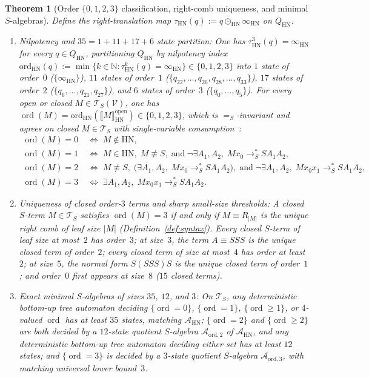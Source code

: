 \documentclass[11pt,reqno]{amsart}
\numberwithin{equation}{section}
\theoremstyle{plain}
\newtheorem{theorem}{Theorem}[section]
\theoremstyle{definition}
\theoremstyle{remark}
\DeclareMathOperator{\ord}{ord}
\newcommand{\TS}{\mathcal{T}_S}
\newcommand{\TSV}{\mathcal{T}_S(\mathcal{V})}
\newcommand{\HN}{\mathrm{HN}}
\newcommand{\sem}[1]{\llbracket #1 \rrbracket}
\newcommand{\redSs}{\to_S^*}
\newcommand{\convS}{=_S}
\begin{document}
\begin{theorem}[Order $\{0, 1, 2, 3\}$ classification, right-comb uniqueness, and minimal $S$-algebras]\label{thm:order-hierarchy}
Define the right-translation map $\tau_{\HN}(q) := q \odot_{\HN} \infty_{\HN}$ on $Q_{\HN}$.
\begin{enumerate}[label=(\roman*),leftmargin=2.2em]
  \item \emph{Nilpotency and $35 = 1 + 11 + 17 + 6$ state partition:} One has $\tau_{\HN}^3(q) = \infty_{\HN}$ for every $q \in Q_{\HN}$, partitioning $Q_{\HN}$ by nilpotency index $\mathrm{ord}_{\HN}(q) := \min\{k \in \mathbb{N} : \tau_{\HN}^k(q) = \infty_{\HN}\} \in \{0, 1, 2, 3\}$ into $1$ state of order~$0$ ($\{\infty_{\HN}\}$), $11$ states of order~$1$ ($\{q_{22}, \dots, q_{26}, q_{28}, \dots, q_{33}\}$), $17$ states of order~$2$ ($\{q_6, \dots, q_{21}, q_{27}\}$), and $6$ states of order~$3$ ($\{q_0, \dots, q_5\}$). For every open or closed $M \in \TSV$, one has $\ord(M) = \mathrm{ord}_{\HN}(\sem{M}_{\HN}^{\mathrm{open}}) \in \{0, 1, 2, 3\}$, which is $\convS$-invariant and agrees on closed $M \in \TS$ with single-variable consumption~\cite[Definition~21]{BarendregtEndrullisKlopWaldmann2017}:
  \begin{align*}
  \ord(M) = 0 &\;\Longleftrightarrow\; M \notin \HN, \\
  \ord(M) = 1 &\;\Longleftrightarrow\; M \in \HN,\; M \not\equiv S,\;\textrm{and}\; \neg\exists A_1, A_2,\; M x_0 \redSs S A_1 A_2, \\
  \ord(M) = 2 &\;\Longleftrightarrow\; M \not\equiv S,\; \bigl(\exists A_1, A_2,\; M x_0 \redSs S A_1 A_2\bigr),\;\textrm{and}\; \neg\exists A_1, A_2,\; M x_0 x_1 \redSs S A_1 A_2, \\
  \ord(M) = 3 &\;\Longleftrightarrow\; \exists A_1, A_2,\; M x_0 x_1 \redSs S A_1 A_2.
  \end{align*}
  \item \emph{Uniqueness of closed order-$3$ terms and sharp small-size thresholds:} A closed $S$-term $M \in \TS$ satisfies $\ord(M) = 3$ if and only if $M \equiv R_{|M|}$ is the unique right comb of leaf size $|M|$ (Definition~\ref{def:syntax}). Every closed $S$-term of leaf size at most~$2$ has order~$3$; at size~$3$, the term $A \equiv S S S$ is the unique closed term of order~$2$; every closed term of size at most~$4$ has order at least~$2$; at size~$5$, the normal form $S(S S S)S$ is the unique closed term of order~$1$; and order~$0$ first appears at size~$8$ ($15$ closed terms).
  \item \emph{Exact minimal $S$-algebras of sizes $35$, $12$, and $3$:} On $\TS$, any deterministic bottom-up tree automaton deciding $\{\ord = 0\}$, $\{\ord = 1\}$, $\{\ord \ge 1\}$, or $4$-valued $\ord$ has at least $35$ states, matching $\mathcal{A}_{\HN}$; $\{\ord = 2\}$ and $\{\ord \ge 2\}$ are both decided by a $12$-state quotient $S$-algebra $\mathcal{A}_{\mathrm{ord},2}$ of $\mathcal{A}_{\HN}$, and any deterministic bottom-up tree automaton deciding either set has at least $12$ states; and $\{\ord = 3\}$ is decided by a $3$-state quotient $S$-algebra $\mathcal{A}_{\mathrm{ord},3}$, with matching universal lower bound~$3$.
\end{enumerate}
\end{theorem}
\end{document}
